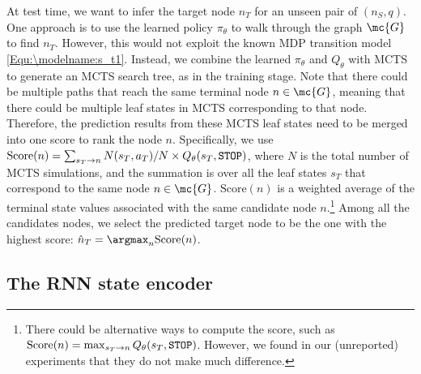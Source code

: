 \documentclass{article}
\begin{document}
	At test time, we want to infer the target node $n_T$ for an unseen pair of $(n_S, q)$. One approach is to use the learned policy $\pi_{\theta}$ to walk through the graph $\mc{G}$ to find $n_T$. However, this would not exploit the known MDP transition model \eqref{Equ:\modelname:s_t1}. Instead, we combine the learned $\pi_{\theta}$ and $Q_{\theta}$ with MCTS to generate an MCTS search tree, as in the training stage. Note that there could be multiple paths that reach the same terminal node $n \in \mc{G}$, meaning that there could be multiple leaf states in MCTS corresponding to that node. Therefore, the prediction results from these MCTS leaf states need to be merged into one score to rank the node $n$. Specifically, we use
	$\mathrm{Score}(n) = \textstyle \sum_{ s_T \rightarrow n} N(s_T, a_T)/{N} \times Q_{\theta}(s_T,\tt{STOP})$,    
    where $N$ is the total number of MCTS simulations, and the summation is over all the leaf states $s_T$ that correspond to the same node $n \in \mc{G}$. 
    $\mathrm{Score}(n)$ is a weighted average of the terminal state values associated with the same candidate node $n$.\footnote{There could be alternative ways to compute the score, such as $\mathrm{Score}(n) = \max_{s_T \rightarrow n} Q_{\theta}(s_T,\tt{STOP})$. However, we found in our (unreported) experiments that they do not make much difference.} Among all the candidates nodes, we select the predicted target node to be the one with the highest score: $\hat{n}_T = \argmax_{n} \mathrm{Score}(n)$.
	
	
	
	
	
	
	\subsection{The RNN state encoder}
	\label{Sec:\modelname:RNNStateEncoder}
	
\end{document}
